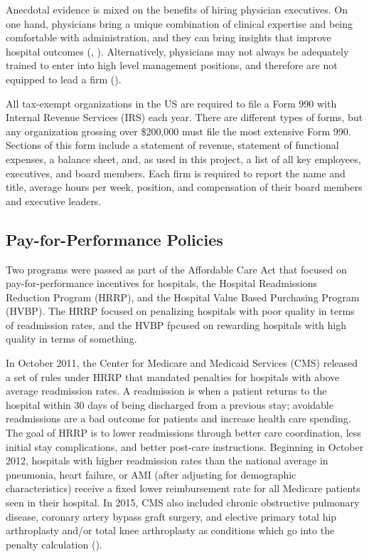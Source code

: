 \documentclass[12pt]{article}
\begin{document}
    Anecdotal evidence is mixed on the benefits of hiring physician executives. On one hand, physicians bring a unique combination of clinical expertise and being comfortable with administration, and they can bring insights that improve hospital outcomes (\cite{Stajduhar_2023}, \cite{Ahmed_2022}). Alternatively, physicians may not always be adequately trained to enter into high level management positions, and therefore are not equipped to lead a firm (\cite{HarvardBusinessReview2018}). 

    All tax-exempt organizations in the US are required to file a Form 990 with Internal Revenue Services (IRS) each year. There are different types of forms, but any organization grossing over \$200,000 must file the most extensive Form 990. Sections of this form include a statement of revenue, statement of functional expenses, a balance sheet, and, as used in this project, a list of all key employees, executives, and board members. Each firm is required to report the name and title, average hours per week, position, and compensation of their board members and executive leaders. 

  
    \subsection{Pay-for-Performance Policies}\label{sec:hrrp}

    Two programs were passed as part of the Affordable Care Act that focused on pay-for-performance incentives for hospitals, the Hospital Readmissions Reduction Program (HRRP), and the Hospital Value Based Purchasing Program (HVBP). The HRRP focused on penalizing hospitals with poor quality in terms of readmission rates, and the HVBP fpcused on rewarding hospitals with high quality in terms of something. 

    In October 2011, the Center for Medicare and Medicaid Services (CMS) released a set of rules under HRRP that mandated penalties for hospitals with above average readmission rates. A readmission is when a patient returns to the hospital within 30 days of being discharged from a previous stay; avoidable readmissions are a bad outcome for patients and increase health care spending. The goal of HRRP is to lower readmissions through better care coordination, less initial stay complications, and better post-care instructions. Beginning in October 2012, hospitals with higher readmission rates than the national average in pneumonia, heart failure, or AMI (after adjusting for demographic characteristics) receive a fixed lower reimbursement rate for all Medicare patients seen in their hospital. In 2015, CMS also included chronic obstructive pulmonary disease, coronary artery bypass graft surgery, and elective primary total hip arthroplasty and/or total knee arthroplasty as conditions which go into the penalty calculation (\cite{CMS}). 
    
\end{document}
